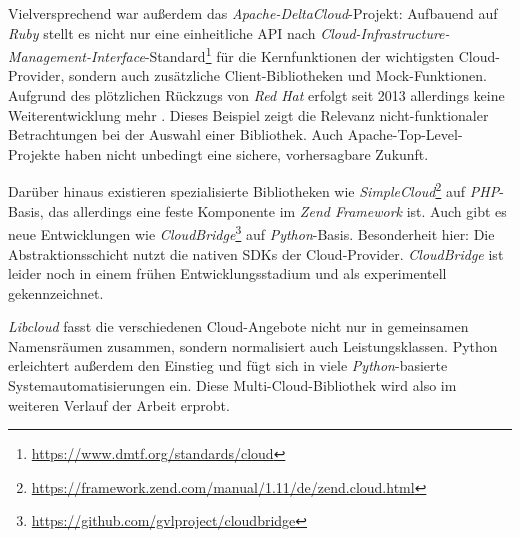 \noindent Vielversprechend war außerdem das \emph{Apache-DeltaCloud}-Projekt: Aufbauend auf \emph{Ruby} stellt es nicht nur eine einheitliche API nach \emph{Cloud-Infrastructure-Management-Interface}-Standard\footnote{\url{https://www.dmtf.org/standards/cloud}} für die Kernfunktionen der wichtigsten Cloud-Provider, sondern auch zusätzliche Client-Bibliotheken und Mock-Funktionen. Aufgrund des plötzlichen Rückzugs von \emph{Red Hat} erfolgt seit 2013 allerdings keine Weiterentwicklung mehr \cite{androu:2013:deltacloud-red-hat-end}. Dieses Beispiel zeigt die Relevanz nicht-funktionaler Betrachtungen bei der Auswahl einer Bibliothek. Auch Apache-Top-Level-Projekte haben nicht unbedingt eine sichere, vorhersagbare Zukunft.

Darüber hinaus existieren spezialisierte Bibliotheken wie \emph{SimpleCloud}\footnote{\url{https://framework.zend.com/manual/1.11/de/zend.cloud.html}} auf \emph{PHP}-Basis, das allerdings eine feste Komponente im \emph{Zend Framework} ist. Auch gibt es neue Entwicklungen wie \emph{CloudBridge}\footnote{\url{https://github.com/gvlproject/cloudbridge}} auf \emph{Python}-Basis. Besonderheit hier: Die Abstraktionsschicht nutzt die nativen SDKs der Cloud-Provider. \emph{CloudBridge} ist leider noch in einem frühen Entwicklungsstadium und als experimentell gekennzeichnet.

\emph{Libcloud} fasst die verschiedenen Cloud-Angebote nicht nur in gemeinsamen Namensräumen zusammen, sondern normalisiert auch Leistungsklassen. Python erleichtert außerdem den Einstieg und fügt sich in viele \emph{Python}-basierte Systemautomatisierungen ein. Diese Multi-Cloud-Bibliothek wird also im weiteren Verlauf der Arbeit erprobt.

